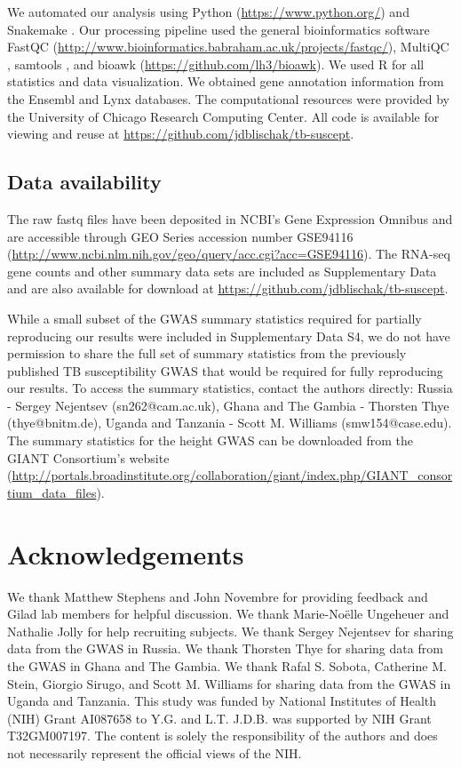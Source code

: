 \documentclass[fleqn,10pt]{wlscirep}
\begin{document}
We automated our analysis using Python (\url{https://www.python.org/})
and Snakemake \cite{Koster2012}. Our processing pipeline used the
general bioinformatics software FastQC
(\url{http://www.bioinformatics.babraham.ac.uk/projects/fastqc/}),
MultiQC \cite{Ewels2016}, samtools \cite{Li2009}, and bioawk
(\url{https://github.com/lh3/bioawk}). We used R \cite{R2015} for all
statistics and data visualization. We obtained gene annotation
information from the Ensembl \cite{Yates2016} and Lynx
\cite{Sulakhe2016} databases. The computational resources were
provided by the University of Chicago Research Computing Center. All
code is available for viewing and reuse at
\url{https://github.com/jdblischak/tb-suscept}.
\subsection*{Data availability}

The raw fastq files have been deposited in NCBI's Gene Expression
Omnibus \cite{Edgar2002} and are accessible through GEO Series
accession number GSE94116
(\url{http://www.ncbi.nlm.nih.gov/geo/query/acc.cgi?acc=GSE94116}).
The RNA-seq gene counts and other summary data sets are included as
Supplementary Data and are also available for download at
\url{https://github.com/jdblischak/tb-suscept}.

While a small subset of the GWAS summary statistics required for
partially reproducing our results were included in Supplementary Data
S4, we do not have permission to share the full set of summary
statistics from the previously published TB susceptibility GWAS that
would be required for fully reproducing our results. To access the
summary statistics, contact the authors directly: Russia - Sergey
Nejentsev (sn262@cam.ac.uk), Ghana and The Gambia - Thorsten Thye
(thye@bnitm.de), Uganda and Tanzania - Scott M. Williams
(smw154@case.edu). The summary statistics for the height GWAS can be
downloaded from the GIANT Consortium’s website
(\url{http://portals.broadinstitute.org/collaboration/giant/index.php/GIANT\_consortium\_data\_files}).
\section*{Acknowledgements}

We thank Matthew Stephens and John Novembre for providing feedback and
Gilad lab members for helpful discussion. We thank Marie-Noëlle
Ungeheuer and Nathalie Jolly for help recruiting subjects. We thank
Sergey Nejentsev for sharing data from the GWAS in Russia. We thank
Thorsten Thye for sharing data from the GWAS in Ghana and The Gambia.
We thank Rafal S. Sobota, Catherine M. Stein, Giorgio Sirugo, and
Scott M. Williams for sharing data from the GWAS in Uganda and
Tanzania. This study was funded by National Institutes of Health (NIH)
Grant AI087658 to Y.G. and L.T. J.D.B. was supported by NIH Grant
T32GM007197. The content is solely the responsibility of the authors
and does not necessarily represent the official views of the NIH.
\end{document}
